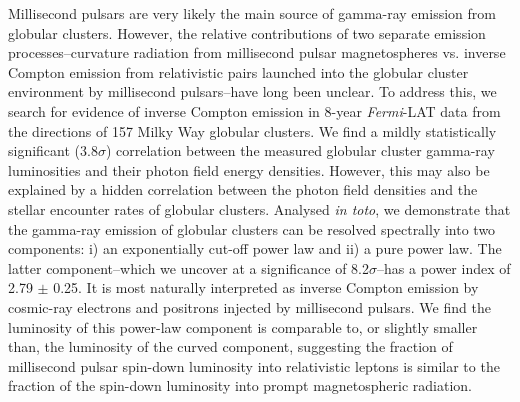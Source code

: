 \documentclass[doublespace,nopageskip]{VTthesis}
\begin{document}
Millisecond pulsars are very likely the main source of gamma-ray emission from globular clusters. However, the relative contributions of two separate emission processes--curvature radiation from millisecond pulsar magnetospheres vs. inverse Compton emission from relativistic pairs launched into the globular cluster environment by millisecond pulsars--have long been unclear. To address this, we search for evidence of inverse Compton emission in 8-year \textit{Fermi}-LAT data from the directions of 157 Milky Way globular clusters. We find a mildly statistically significant (3.8$\sigma$) correlation between the measured globular cluster gamma-ray luminosities and their photon field energy densities. However, this may also be explained by a hidden correlation between the photon field densities and the stellar encounter rates of globular clusters. Analysed {\it in toto},  we demonstrate that the gamma-ray emission of globular clusters can be resolved spectrally into two components:  i) an exponentially cut-off power law and ii) a pure power law. The latter component--which we uncover at a significance of 8.2$\sigma$--{has a power index of 2.79 $\pm$ 0.25. It} is most naturally interpreted as inverse Compton emission by cosmic-ray electrons and positrons injected by millisecond pulsars. We find the luminosity of this {power-law} component is comparable to, or slightly smaller than, the luminosity of the curved component, suggesting the fraction of millisecond pulsar spin-down luminosity into relativistic leptons is similar to the fraction of the spin-down luminosity into prompt magnetospheric radiation.

\end{document}
